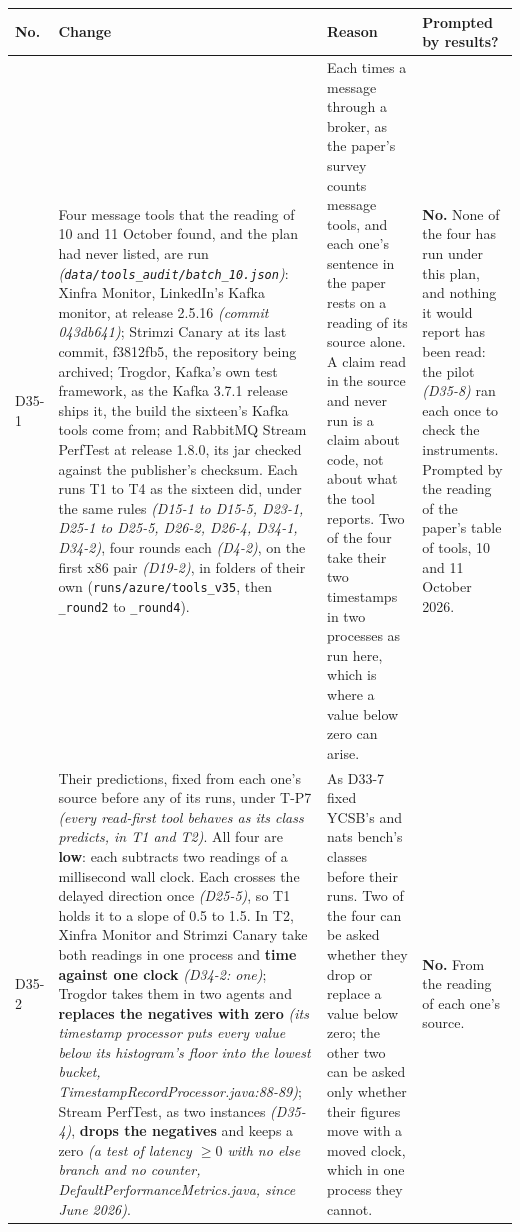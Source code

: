 \documentclass[11pt]{article}
\newcommand{\gl}[1]{{\color{soft}\itshape\small (#1)}}
\begin{document}
{\small
\begin{longtable}{@{}p{1.1cm} >{\raggedright\arraybackslash}p{6.1cm} >{\raggedright\arraybackslash}p{6.0cm} >{\raggedright\arraybackslash}p{2.2cm}@{}}
\toprule
\textbf{No.} & \textbf{Change} & \textbf{Reason} & \textbf{Prompted by results?} \\
\midrule
\endhead
D35-1 & Four message tools that the reading of 10 and 11 October found, and the plan had never listed, are run \gl{\texttt{data/tools\_audit/batch\_10.json}}: Xinfra Monitor, LinkedIn's Kafka monitor, at release 2.5.16 \gl{commit 043db641}; Strimzi Canary at its last commit, f3812fb5, the repository being archived; Trogdor, Kafka's own test framework, as the Kafka 3.7.1 release ships it, the build the sixteen's Kafka tools come from; and RabbitMQ Stream PerfTest at release 1.8.0, its jar checked against the publisher's checksum. Each runs T1 to T4 as the sixteen did, under the same rules \gl{D15-1 to D15-5, D23-1, D25-1 to D25-5, D26-2, D26-4, D34-1, D34-2}, four rounds each \gl{D4-2}, on the first x86 pair \gl{D19-2}, in folders of their own (\texttt{runs/azure/tools\_v35}, then \texttt{\_round2} to \texttt{\_round4}). & Each times a message through a broker, as the paper's survey counts message tools, and each one's sentence in the paper rests on a reading of its source alone. A claim read in the source and never run is a claim about code, not about what the tool reports. Two of the four take their two timestamps in two processes as run here, which is where a value below zero can arise. & \textbf{No.} None of the four has run under this plan, and nothing it would report has been read: the pilot \gl{D35-8} ran each once to check the instruments. Prompted by the reading of the paper's table of tools, 10 and 11 October 2026. \\
D35-2 & Their predictions, fixed from each one's source before any of its runs, under T-P7 \gl{every read-first tool behaves as its class predicts, in T1 and T2}. All four are \textbf{low}: each subtracts two readings of a millisecond wall clock. Each crosses the delayed direction once \gl{D25-5}, so T1 holds it to a slope of 0.5 to 1.5. In T2, Xinfra Monitor and Strimzi Canary take both readings in one process and \textbf{time against one clock} \gl{D34-2: one}; Trogdor takes them in two agents and \textbf{replaces the negatives with zero} \gl{its timestamp processor puts every value below its histogram's floor into the lowest bucket, TimestampRecordProcessor.java:88-89}; Stream PerfTest, as two instances \gl{D35-4}, \textbf{drops the negatives} and keeps a zero \gl{a test of latency $\ge 0$ with no else branch and no counter, DefaultPerformanceMetrics.java, since June 2026}. & As D33-7 fixed YCSB's and nats bench's classes before their runs. Two of the four can be asked whether they drop or replace a value below zero; the other two can be asked only whether their figures move with a moved clock, which in one process they cannot. & \textbf{No.} From the reading of each one's source. \\

\end{longtable}}
\end{document}
